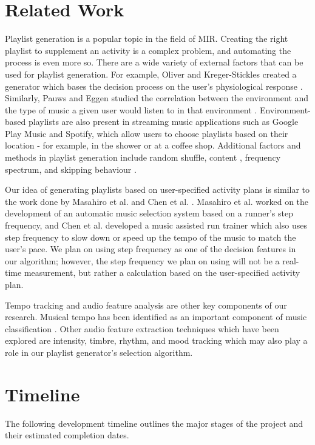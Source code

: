\documentclass{article}
\begin{document}
\section{Related Work}
Playlist generation is a popular topic in the field of MIR. Creating the right playlist to supplement an activity is a complex problem, and automating the process is even more so. There are a wide variety of external factors that can be used for playlist generation. For example, Oliver and Kreger-Stickles created a generator which bases the decision process on the user's physiological response \cite{Oliver}. Similarly, Pauws and Eggen studied the correlation between the environment and the type of music a given user would listen to in that environment \cite{Pauws}. Environment-based playlists are also present in streaming music applications such as Google Play Music and Spotify, which allow users to choose playlists based on their location - for example, in the shower or at a coffee shop. Additional factors and methods in playlist generation include random shuffle, content \cite{Logan}, frequency spectrum, and skipping behaviour \cite{Pampalk}.

Our idea of generating playlists based on user-specified activity plans is similar to the work done by Masahiro et al. \cite{Masahiro} and Chen et al. \cite{Chen}. Masahiro et al. worked on the development of an automatic music selection system based on a runner's step frequency, and Chen et al. developed a music assisted run trainer which also uses step frequency to slow down or speed up the tempo of the music to match the user's pace. We plan on using step frequency as one of the decision features in our algorithm; however, the step frequency we plan on using will not be a real-time measurement, but rather a calculation based on the user-specified activity plan.

Tempo tracking and audio feature analysis are other key components of our research. Musical tempo has been identified as an important component of music classification \cite{McKinney} \cite{Pikrakis} \cite{Alonso}. Other audio feature extraction techniques which have been explored are intensity, timbre, rhythm, and mood tracking \cite{Liu} which may also play a role in our playlist generator's selection algorithm.

\section{Timeline}
The following development timeline outlines the major stages of the project and their estimated completion dates.
\end{document}
